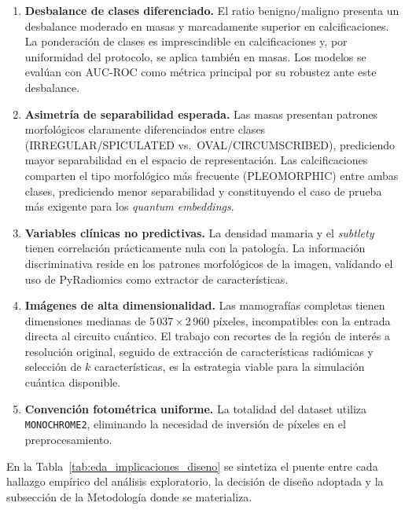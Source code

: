 \begin{enumerate}

\item \textbf{Desbalance de clases diferenciado.}
El ratio benigno/maligno presenta un desbalance moderado en masas
y marcadamente superior en calcificaciones. La ponderación de
clases es imprescindible en calcificaciones y, por
uniformidad del protocolo, se aplica también en masas. Los modelos se evalúan con
AUC-ROC como métrica principal por su robustez ante este desbalance.

\item \textbf{Asimetría de separabilidad esperada.}
Las masas presentan patrones morfológicos claramente diferenciados
entre clases (IRREGULAR/\allowbreak SPICULATED vs.\ OVAL/\allowbreak CIRCUMSCRIBED),
prediciendo mayor separabilidad en el espacio de representación. Las
calcificaciones comparten el tipo morfológico más frecuente (PLEOMORPHIC)
entre ambas clases, prediciendo menor separabilidad y constituyendo el
caso de prueba más exigente para los \textit{quantum embeddings}.

\item \textbf{Variables clínicas no predictivas.}
La densidad mamaria y el \textit{subtlety} tienen correlación
prácticamente nula con la patología. La información discriminativa
reside en los patrones morfológicos de la imagen, validando el uso de
PyRadiomics como extractor de características.

\item \textbf{Imágenes de alta dimensionalidad.}
Las mamografías completas tienen dimensiones medianas de
5\,037\,$\times$\,2\,960 píxeles, incompatibles con la entrada directa
al circuito cuántico. El trabajo con recortes de la región de interés
a resolución original, seguido de extracción de características
radiómicas y selección de $k$ características, es la estrategia viable
para la simulación cuántica disponible.

\item \textbf{Convención fotométrica uniforme.}
La totalidad del dataset utiliza \texttt{MONOCHROME2}, eliminando la
necesidad de inversión de píxeles en el preprocesamiento.

\end{enumerate}

En la Tabla~\ref{tab:eda_implicaciones_diseno} se sintetiza el puente
entre cada hallazgo empírico del análisis exploratorio, la decisión de
diseño adoptada y la subsección de la Metodología donde se materializa.


